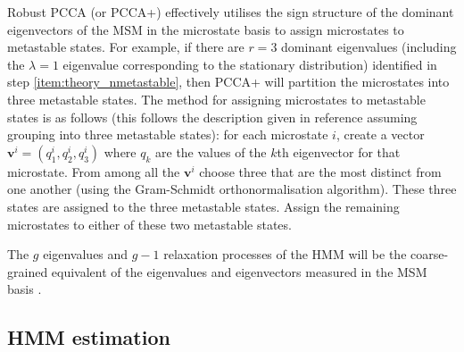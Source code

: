 Robust PCCA (or PCCA+) effectively utilises the sign structure of the dominant eigenvectors of the MSM in the microstate basis to assign microstates to metastable states. For example, if there are $r=3$ dominant eigenvalues (including the $\lambda = 1$ eigenvalue corresponding to the stationary distribution) identified in step \ref{item:theory_nmetastable}, then PCCA+ will partition the microstates into three metastable states. The method for assigning microstates to metastable states is as follows (this follows the description given in reference \cite{bowmanQuantitativeComparisonAlternative2013} assuming grouping into three metastable states): for each microstate $i$, create a vector $\mathbf{v}^{i}=(q^{i}_{1}, q^{i}_{2}, q^{i}_{3})$ where $q_{k}$ are the values of the $k$th eigenvector for that microstate. From among all the $\mathbf{v}^{i}$ choose three that are the most distinct from one another (using the Gram-Schmidt orthonormalisation algorithm). These three states are assigned to the three metastable states.  Assign the remaining microstates to either of these two metastable states. 

The $g$ eigenvalues and $g-1$ relaxation processes of the HMM will be the coarse-grained equivalent of the  eigenvalues and eigenvectors measured in the MSM basis \cite{noeProjectedHiddenMarkov2013a}. 

\subsection{HMM estimation}

